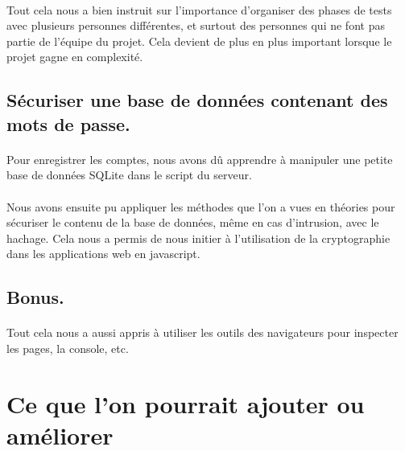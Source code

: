 \documentclass[11pt,a4paper]{article}
\begin{document}
            \paragraph{}
            Tout cela nous a bien instruit sur l'importance d'organiser des phases de tests
            avec plusieurs personnes différentes,
            et surtout des personnes qui ne font pas partie de l'équipe du projet.
            Cela devient de plus en plus important lorsque le projet gagne en complexité.
        \subsection*{Sécuriser une base de données contenant des mots de passe.}
            \paragraph{}
            Pour enregistrer les comptes,
            nous avons dû apprendre à manipuler une petite base de données SQLite dans le script du serveur.
            \paragraph{}
            Nous avons ensuite pu appliquer les méthodes que l'on a vues en théories
            pour sécuriser le contenu de la base de données, même en cas d'intrusion, avec le hachage.
            Cela nous a permis de nous initier à l'utilisation de la cryptographie dans les applications web en javascript.
        \subsection*{Bonus.}
            \paragraph{}
            Tout cela nous a aussi appris à utiliser les outils des navigateurs pour inspecter les pages,
            la console, etc.
    \section{Ce que l'on pourrait ajouter ou améliorer}
\end{document}

